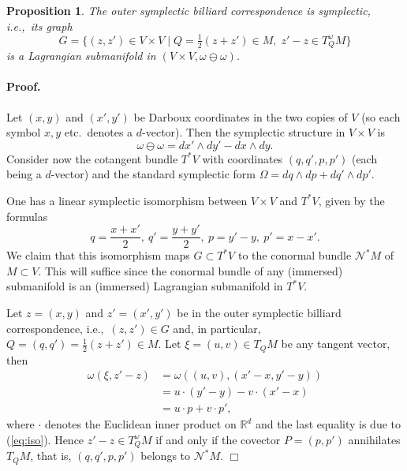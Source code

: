 \documentclass[12pt]{article}
\newtheorem{proposition}[lemma]{Proposition}
\newcommand{\proofend}{$\Box$\bigskip}
\newcommand{\R}{{\mathbb R}}
\def\proof{\paragraph{Proof.}}
\begin{document}

\begin{proposition} \label{pr:corrsymp}
The outer symplectic billiard correspondence is symplectic, i.e.,~its graph
$$
G=\{(z,z')\in V\times V\mid Q=\tfrac12(z+z')\in M,\;z'-z\in T^\omega_Q M\}
$$ 
is a Lagrangian submanifold in $(V \times V,\omega \ominus \omega)$.
\end{proposition}

\proof

Let $ (x,y)$ and $(x',y')$ be Darboux coordinates in the two copies of $V$ (so each symbol $x,y$ etc.~denotes a $d$-vector). Then  the symplectic structure in $V\times V$ is
$$
\omega \ominus \omega = d x'\wedge d y' - dx\wedge dy.
$$
%
Consider now the cotangent bundle $T^* V$ with coordinates $(q,q',p,p')$ (each being a $d$-vector) and the standard symplectic form $\Omega=dq\wedge dp + dq'\wedge dp'$.

One has a linear symplectic isomorphism between $V \times V$ and $T^* V$, given by the formulas
\begin{equation} \label{eq:iso}
q=\frac{x+ x'}{2},\ q'=\frac{y+ y'}{2},\ p=y'-y,\ p'= x-x'.
\end{equation}
%
We claim that this isomorphism maps $G \subset T^* V$ to the conormal bundle ${\mathcal N}^* M$ of $M \subset V$. 
This will suffice since the conormal bundle of any (immersed) submanifold is an (immersed) Lagrangian submanifold in $T^* V$.

Let $z=(x,y)$ and $z'=(x',y')$ be in the outer symplectic billiard correspondence, i.e.,~$(z,z')\in G$ and, in particular, $Q=(q,q')=\frac12(z+z')\in M$. Let $\xi=(u,v) \in T_Q M$ be any tangent vector, then 
\begin{equation}\nonumber
\begin{aligned}
\omega(\xi,z'-z)&=\omega((u,v),(x'-x,y'-y))\\ 
&= u \cdot (y'-y) - v \cdot (x'-x)\\ 
&= u \cdot p + v \cdot p',
\end{aligned}
\end{equation}
where $\cdot$ denotes the Euclidean inner product on $\R^d$ and the last equality is due to (\ref{eq:iso}). Hence $z'-z\in T^\omega_Q M$ if and only if the covector $P=(p,p')$ annihilates $T_{Q} M$, that is, $(q,q',p,p')$ belongs to ${\mathcal N}^* M$.
\proofend
\end{document}
